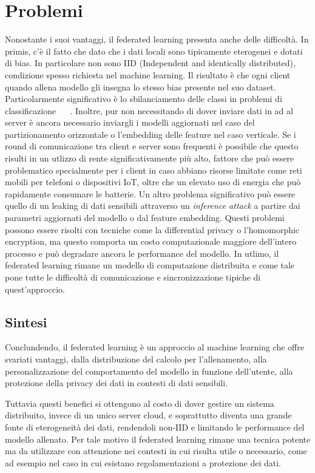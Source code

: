 \section{Problemi}
Nonostante i suoi vantaggi, il federated learning presenta anche delle 
difficoltà.
In primis, c'è il fatto che dato che i dati locali sono tipicamente 
eterogenei e dotati di bias. In particolare non sono IID (Independent
and identically distributed), condizione spesso richiesta nel 
machine learning. Il risultato è che ogni client quando allena modello 
gli insegna lo stesso bias presente nel suo dataset. Particolarmente
significativo è lo sbilanciamento delle classi in problemi di 
classificazione ~\cite{zhao2018flniid} ~\cite{xiao2021flci}.
Inoltre, pur non necessitando di dover inviare dati in ad al server è
ancora necessario inviargli i modelli aggiornati nel caso del 
partizionamento orizzontale o l'embedding delle feature nel caso 
verticale. Se i round di comunicazione tra client e server sono 
frequenti è possibile che questo risulti in un utlizzo di rente 
significativamente più alto, fattore che può essere problematico
specialmente per i client in caso abbiano risorse limitate come reti 
mobili per telefoni o dispositivi IoT, oltre che un elevato uso di 
energia che può rapidamente consumare le batterie.
Un altro problema significativo può essere quello di un leaking di 
dati sensibili attraverso un \textit{inference attack} a partire 
dai parametri aggiornati del modello o dal feature embedding. Questi 
problemi possono essere risolti con tecniche come la differential 
privacy o l'homomorphic encryption, ma questo comporta un costo 
computazionale maggiore dell'intero processo e può degradare ancora 
le performance del modello.
In utlimo, il federated learning rimane un modello di computazione 
distribuita e come tale pone tutte le difficoltà di comunicazione e 
sincronizzazione tipiche di quest'approccio.


\subsection{Sintesi}
Conclundendo, il federated learning è un approccio al machine 
learning che offre svariati vantaggi, dalla distribuzione del 
calcolo per l'allenamento, alla personalizzazione del comportamento 
del modello in funzione dell'utente, alla protezione della 
privacy dei dati in contesti di dati sensibili.

Tuttavia questi benefici si ottengono al costo di dover gestire
un sistema distribuito, invece di un unico server cloud, e 
soprattutto diventa una grande fonte di eterogeneità dei dati,
rendendoli non-IID e limitando le performance del modello 
allenato. Per tale motivo il federated learning rimane una 
tecnica potente ma da utilizzare con attenzione nei contesti 
in cui risulta utile o necessario, come ad esempio nel caso in 
cui esistano regolamentazioni a protezione dei dati.
